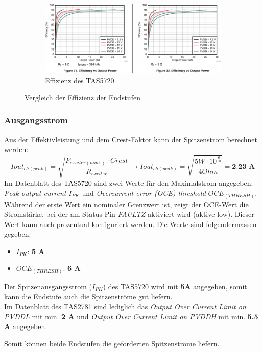 \begin{figure}[ht]\ContinuedFloat
	\centering
	\begin{subfigure}{\textwidth}
		\centering
		\includegraphics[width=\textwidth*7/8]{pictures/tas5720l_efficiency.png}
		\vspace{2mm}
		\caption{Effizienz des TAS5720}
		\label{pic:effizien_TAS5720}
	\end{subfigure}
	\caption{Vergleich der Effizienz der Endstufen}
	\label{pic:effizienz_vergleich}
\end{figure}
\subsubsection{Ausgangsstrom}
Aus der Effektivleistung und dem Crest-Faktor kann der Spitzenstrom berechnet werden:
\begin{equation}
	Iout_{ch(peak)} = \sqrt{\frac{P_{exciter(nom.)} \cdot Crest}{R_{exciter}}}  \rightarrow Iout_{ch(peak)} = \sqrt{\frac{5W \cdot 10^{\frac{6}{10}}}{4 Ohm}} = \textbf{2.23 A}
	\label{eq:peak_out_current_per_channel}
\end{equation}
Im Datenblatt des TAS5720 sind zwei Werte für den Maximalstrom angegeben: \textit{Peak output current} $I_{PK}$ und \textit{Overcurrent error (OCE)
threshold} $OCE_{(THRESH)}$. Während der erste Wert ein nominaler Grenzwert ist, zeigt der OCE-Wert die Stromstärke, bei der am Status-Pin \textit{FAULTZ} aktiviert wird (aktive low). Dieser Wert kann auch prozentual konfiguriert werden. Die Werte sind folgendermassen gegeben:
\begin{itemize}
	\item $I_{PK}$: \textbf{5 A}
	\item $OCE_{(THRESH)}$: \textbf{6 A}
\end{itemize}
Der Spitzenausgangsstrom ($I_{PK}$) des TAS5720 wird mit \textbf{5A} angegeben, somit kann die Endstufe auch die Spitzenströme gut liefern.\\
Im Datenblatt des TAS2781 sind lediglich das \textit{Output Over Current Limit on PVDDL} mit min. \textbf{2 A} und  \textit{Output Over Current Limit on PVDDH} mit min. \textbf{5.5 A} angegeben.
\begin{center}
	\begin{minipage}{\textwidth*7/8}
		\centering
		Somit können beide Endstufen die geforderten Spitzenströme liefern.
	\end{minipage}
\end{center}
